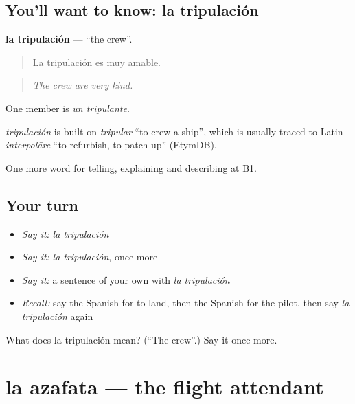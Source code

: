 \subsection*{You'll want to know: la tripulación}
\textbf{la tripulación} — \textquotedblleft{}the crew\textquotedblright{}.

\begin{quote}
La tripulación es muy amable.
\end{quote}

\begin{quote}
\emph{The crew are very kind.}
\end{quote}

One member is \emph{un tripulante}.

\begin{cousinweb}
\emph{tripulación} is built on \emph{tripular} \textquotedblleft{}to crew a ship\textquotedblright{}, which is usually traced to Latin \emph{interpolāre} \textquotedblleft{}to refurbish, to patch up\textquotedblright{} (EtymDB).
\end{cousinweb}

\begin{grammarlens}[title={What you've built}]
One more word for telling, explaining and describing at B1.
\end{grammarlens}

\subsection*{Your turn}
\begin{itemize}
\raggedright
  \item \emph{Say it:} \emph{la tripulación}
  \item \emph{Say it:} \emph{la tripulación}, once more
  \item \emph{Say it:} a sentence of your own with \emph{la tripulación}
  \item \emph{Recall:} say the Spanish for to land, then the Spanish for the pilot, then say \emph{la tripulación} again
\end{itemize}

\begin{tcolorbox}[breakable,colback=teal!4,colframe=teal!35!black,title={Before you move on}]
What does la tripulación mean? (\textquotedblleft{}The crew\textquotedblright{}.) Say it once more.
\end{tcolorbox}
\section[la azafata]{la azafata — the flight attendant}

